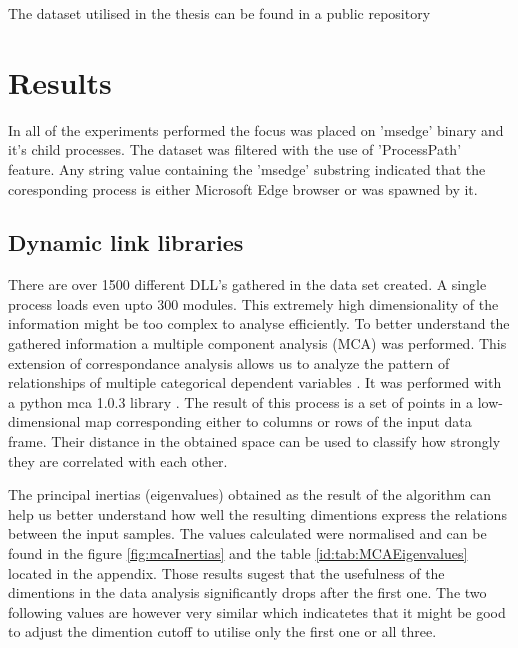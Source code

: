 \documentclass[a4paper,twoside,12pt]{book}
\begin{document}
The dataset utilised in the thesis can be found in a public repository %


\section{Results}

In all of the experiments performed the focus was placed on 'msedge' binary and it's child processes.
The dataset was filtered with the use of 'ProcessPath' feature. Any string value containing the 'msedge'
substring indicated that the coresponding process is either Microsoft Edge browser or was spawned by it. 

\subsection{Dynamic link libraries}
There are over 1500 different DLL's gathered in the data set created. A single process loads 
even upto 300 modules. This extremely high dimensionality of the information might be too complex 
to analyse efficiently. To better understand the gathered information a multiple component 
analysis (MCA) was performed. This extension of correspondance analysis allows us to analyze the 
pattern of relationships of multiple categorical dependent variables \cite{bib:mca}. It was performed 
with a python mca 1.0.3 library \cite{bib:pymca}. The result of this process is a set of points in a 
low-dimensional map corresponding either to columns or rows of the input data frame. Their 
distance in the obtained space can be used to classify how strongly they are correlated with 
each other. 

The principal inertias (eigenvalues) obtained as the result of the algorithm can help us better 
understand how well the resulting dimentions express the relations between the input samples. 
The values calculated were normalised and can be found in the figure \ref{fig:mcaInertias} and 
the table \ref{id:tab:MCAEigenvalues} located in the appendix. Those results sugest that the 
usefulness of the dimentions in the data analysis significantly drops after the first one. The two
following values are however very similar which indicatetes that it might be good to adjust the 
dimention cutoff to utilise only the first one or all three.
\end{document}
